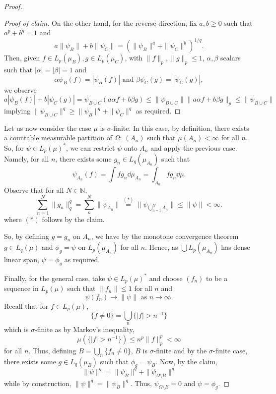 \documentclass[]{article}
\theoremstyle{definition}
\begin{document}
\begin{proof}
\begin{proof}[Proof of claim]
    On the other hand, for the reverse direction, fix \(a, b \ge 0\) such that \(a^p + b^q = 1\) and 
    \[a\|\psi_B\| + b\|\psi_C\| = (\|\psi_B\|^a + \|\psi_C\|^b)^{1 / q}.\]
    Then, given \(f \in L_p(\mu_B), g \in L_p(\mu_C)\), with \(\|f\|_p, \|g\|_p \le 1\), 
    \(\alpha, \beta\) scalars such that \(|\alpha| = |\beta| = 1\) and 
    \[\alpha \psi_B(f) = |\psi_B(f)| \text{ and } \beta\psi_C(g) = |\psi_C(g)|,\] 
    we observe
    \[a |\psi_B(f)| + b|\psi_C(g)| = \psi_{B \cup C}(a\alpha f + b \beta g) \le 
      \|\psi_{B \cup C}\| \|a \alpha f + b \beta g\|_p \le \|\psi_{B \cup C}\|\]
    implying \(\|\psi_{B \cup C}\|^q \ge \|\psi_B\|^q + \|\psi_C\|^q\) as required.
  \end{proof}

  Let us now consider the case \(\mu\) is \(\sigma\)-finite. In this case, by definition, there exists 
  a countable measurable partition of \(\Omega\): \((A_n)\) such that \(\mu(A_n) < \infty\) for all \(n\). 
  So, for \(\psi \in L_p(\mu)^*\), we can restrict \(\psi\) onto \(A_n\) and apply the previous 
  case. Namely, for all \(n\), there exists some \(g_n \in L_q(\mu_{A_n})\) such that
  \[\psi_{A_n}(f) = \int f g_n \dd \mu_{A_n} = \int_{A_n} f g_n \dd\mu.\]
  Observe that for all \(N \in \mathbb{N}\),
  \[\sum_{n = 1}^N \|g_n\|_q^q = \sum_n^N \|\psi_{A_n}\| \stackrel{(*)}{=} 
  \|\psi_{\bigcup_{n = 1}^N A_n}\| \le \|\psi\| < \infty.\]
  where \((*)\) follows by the claim.

  So, by defining \(g = g_n\) on \(A_n\), we have by the monotone convergence theorem 
  \(g \in L_q(\mu)\) and \(\phi_g = \psi\) on \(L_p(\mu_{A_n})\) for all \(n\). Hence, as 
  \(\bigcup L_p(\mu_{A_n})\) has dense linear span, \(\psi = \phi_g\) as required.

  Finally, for the general case, take \(\psi \in L_p(\mu)^*\) and choose \((f_n)\) 
  to be a sequence in \(L_p(\mu)\) such that \(\|f_n\| \le 1\) for all \(n\) and 
  \[\psi(f_n) \to \|\psi\| \text{ as } n \to \infty.\]
  Recall that for \(f \in L_p(\mu)\), 
  \[\{f \neq 0\} = \bigcup_n \{|f| > n^{-1}\}\]
  which is \(\sigma\)-finite as by Markov's inequality,
  \[\mu(\{|f| > n^{-1}\}) \le n^p \|f\|_p^p < \infty\]
  for all \(n\). Thus, defining \(B = \bigcup_n \{f_n \neq 0\}\), \(B\) is \(\sigma\)-finite and 
  by the \(\sigma\)-finite case, there exists some \(g \in L_q(\mu_B)\) such that 
  \(\phi_g = \psi_B\). Now, by the claim,
  \[\|\psi\|^q = \|\psi_B\|^q + \|\psi_{\Omega \setminus B}\|^q\]
  while by construction, \(\|\psi\|^q = \|\psi_B\|^q\). Thus, \(\psi_{\Omega \setminus B} = 0\) 
  and \(\psi = \phi_g\).


\end{proof}
\end{document}
